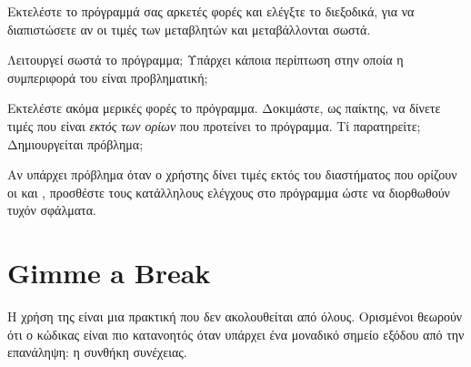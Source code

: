 \documentclass[a4paper,11pt,oneside]{book}
\begin{document}
\begin{step}
Εκτελέστε το πρόγραμμά σας αρκετές φορές και ελέγξτε το διεξοδικά, για να διαπιστώσετε αν οι τιμές των μεταβλητών  και  μεταβάλλονται σωστά.

Λειτουργεί σωστά το πρόγραμμα; Υπάρχει κάποια περίπτωση στην οποία η συμπεριφορά του είναι προβληματική; 

\marginnote[14pt]{\icondiscuss}
\dottedline

\end{step}

\begin{step}


Εκτελέστε ακόμα μερικές φορές το πρόγραμμα. Δοκιμάστε, ως παίκτης, να δίνετε τιμές που είναι \emph{εκτός των ορίων} που προτείνει το πρόγραμμα. Τί παρατηρείτε; Δημιουργείται πρόβλημα;

\marginnote[14pt]{\icondiscuss}
\dottedline

\dottedline

Αν υπάρχει πρόβλημα όταν ο χρήστης δίνει τιμές εκτός του διαστήματος που ορίζουν οι  και , προσθέστε τους κατάλληλους ελέγχους στο πρόγραμμα ώστε να διορθωθούν τυχόν σφάλματα.
\end{step}

\section{Gimme a Break}


Η χρήση της  είναι μια πρακτική που δεν ακολουθείται από όλους. Ορισμένοι θεωρούν ότι ο κώδικας είναι πιο κατανοητός όταν υπάρχει ένα μοναδικό σημείο εξόδου από την επανάληψη: η συνθήκη συνέχειας.
\end{document}
